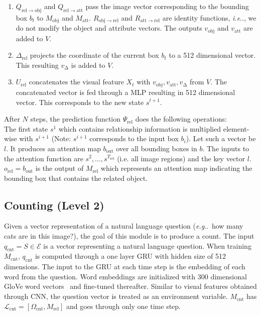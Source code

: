 \documentclass{article}
\makeatletter
\def\E{\mathcal{E}}
\def\Mobj{M_\mathrm{obj}}
\def\Matt{M_\mathrm{att}}
\def\Mrel{M_\mathrm{rel}}
\def\Mcnt{M_\mathrm{cnt}}
\DeclareRobustCommand\onedot{\futurelet\@let@token\@onedot}
\def\@onedot{\ifx\@let@token.\else.\null\fi\xspace}
\def\eg{\emph{e.g}\onedot} \def\Eg{\emph{E.g}\onedot}
\def\ie{\emph{i.e}\onedot} \def\Ie{\emph{I.e}\onedot}
\makeatother
\begin{document}
\begin{enumerate}[\hspace{0pt}(1)]

\item{
$Q_{\mathrm{rel}\rightarrow\mathrm{obj}}$ and $Q_{\mathrm{rel}\rightarrow\mathrm{att}}$ pass the image vector corresponding to the bounding box $b_t$ to $\Mobj$ and $\Matt$.
$R_{\mathrm{obj}\rightarrow\mathrm{rel}}$ and $R_{\mathrm{att}\rightarrow\mathrm{rel}}$ are identity functions, \ie, we do not modify the object and attribute vectors.
The outputs $v_\mathrm{obj}$ and $v_\mathrm{att}$ are added to $V$.
} 

\item{
$\Delta_\mathrm{rel}$ projects the coordinate of the current box $b_t$ to a 512 dimensional vector.
This resulting $v_\mathrm{\Delta}$ is added to $V$.
} 

\item{
$U_\mathrm{rel}$ concatenates the visual feature $X_t$ with $v_\mathrm{obj}, v_\mathrm{att}, v_\mathrm{\Delta}$ from $V$.
The concatenated vector is fed through a MLP resulting in 512 dimensional vector.
This corresponds to the new state $s^{t+1}$.
} 
\end{enumerate}
After $N$ steps, the prediction function $\Psi_\mathrm{rel}$ does the following operations:
\\
The first state $s^1$ which contains relationship information is multiplied element-wise with $s^{i+1}$ (Note: $s^{i+1}$ corresponds to the input box $b_i$).
Let such a vector be $l$.
It produces an attention map $b_\mathrm{out}$ over all bounding boxes in $b$.
The inputs to the attention function are $s^2,\ldots,s^{T_\mathrm{rel}}$ (i.e. all image regions) and the key vector $l$.
$o_\mathrm{rel} = b_\mathrm{out}$ is the output of $\Mrel$ which represents an attention map indicating the bounding box that contains the related object.

\subsection{Counting (Level 2)}
Given a vector representation of a natural language question (\eg~how many cats are in this image?), the goal of this module is to produce a count.
The input $q_\mathrm{cnt} = S \in \E$ is a vector representing a natural language question.
When training $\Mcnt$, $q_\mathrm{cnt}$ is computed through a one layer GRU with hidden size of 512 dimensions.
The input to the GRU at each time step is the embedding of each word from the question.
Word embeddings are initialized with 300 dimensional GloVe word vectors~\citep{pennington14} and fine-tuned thereafter.
Similar to visual features obtained through CNN, the question vector is treated as an environment variable.
$\Mcnt$ has $\mathcal L_\mathrm{cnt} = [\Omega_\mathrm{cnt}, \Mrel]$ and goes through only one time step.
\end{document}
